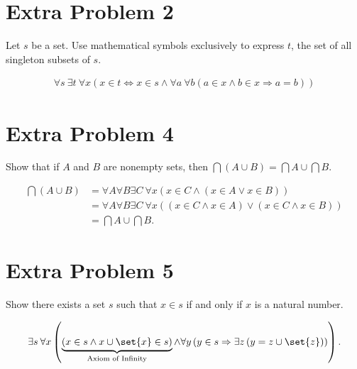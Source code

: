 \documentclass[10pt]{mypackage}
\begin{document}
\section{Extra Problem 2}%
\begin{problem}
  Let $s$ be a set. Use mathematical symbols exclusively to express $t$, the set of all singleton subsets of $s$.
\end{problem}
\begin{solution}
  \begin{align*}
    \forall s\:\exists t\:\forall x\left(x\in t \Leftrightarrow x\in s \wedge \forall a\:\forall b\left(a\in x \wedge b\in x \Rightarrow a = b\right)\right)
  \end{align*}
\end{solution}
\section{Extra Problem 4}%
\begin{problem}
  Show that if $A$ and $B$ are nonempty sets, then $\bigcap\left(A\cup B\right) = \bigcap A \cup \bigcap B$.
\end{problem}
\begin{solution}
  \begin{align*}
  \bigcap\left(A\cup B\right) &= \forall A \forall B \exists C \: \forall x\left(x\in C \wedge \left(x\in A \vee x\in B\right)\right)\\
                              &= \forall A\forall B\exists C\: \forall x\left(\left(x\in C \wedge x\in A\right) \vee \left(x\in C \wedge x\in B\right)\right)\\
                              &= \bigcap A \cup \bigcap B.
  \end{align*}
\end{solution}
\section{Extra Problem 5}%
\begin{problem}
  Show there exists a set $s$ such that $x\in s$ if and only if $x$ is a natural number.
\end{problem}
\begin{solution}
  \begin{align*}
    \exists s \: \forall x \left(\underbrace{\left(x\in s \wedge x\cup \set{x}\in s\right)}_{\text{Axiom of Infinity}}\wedge \forall y\left(y\in s \Rightarrow \exists z\left(y = z \cup \set{z}\right)\right)\right).
  \end{align*}
\end{solution}
\end{document}
